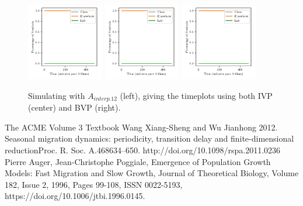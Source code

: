 \documentclass[11pt]{amsart}
\begin{document}
\begin{figure}[htp]
    \centering
    \includegraphics[width=0.3\textwidth]{temp.pdf}\hfill
    \includegraphics[width=0.3\textwidth]{temp.pdf}\hfill
    \includegraphics[width=0.3\textwidth]{temp.pdf}\hfill
    \caption{Simulating with $A_{interp.12}$ (left), giving the timeplots using both IVP (center) and BVP (right).}
    \label{fig:continuous_alpha}

\end{figure}









\FloatBarrier %
\newpage


\begin{thebibliography}{99}
 The ACME Volume 3 Textbook
 Wang Xiang-Sheng and Wu Jianhong 2012. Seasonal migration dynamics: periodicity, transition delay and finite-dimensional reductionProc. R. Soc. A.468634–650. http://doi.org/10.1098/rspa.2011.0236
 Pierre Auger, Jean-Christophe Poggiale, Emergence of Population Growth Models: Fast Migration and Slow Growth, Journal of Theoretical Biology, Volume 182, Issue 2, 1996, Pages 99-108, ISSN 0022-5193, https://doi.org/10.1006/jtbi.1996.0145.
\end{thebibliography}
\end{document}
